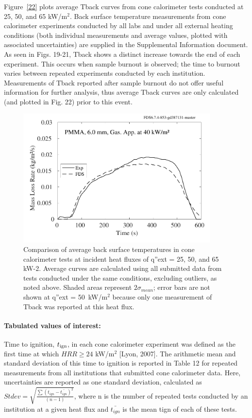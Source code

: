 \documentclass{book}
\begin{document}
Figure~\ref{22} plots average Tback curves from cone calorimeter tests conducted at 25, 50, and 65 kW/m$^2$. Back surface temperature measurements from cone calorimeter experiments conducted by all labs and under all external heating conditions (both individual measurements and average values, plotted with associated uncertainties) are supplied in the Supplemental Information document. As seen in Figs. 19-21, Tback shows a distinct increase towards the end of each experiment. This occurs when sample burnout is observed; the time to burnout varies between repeated experiments conducted by each institution. Measurements of Tback reported after sample burnout do not offer useful information for further analysis, thus average Tback curves are only calculated (and plotted in Fig. 22) prior to this event.

\begin{figure}
  \centering
  \includegraphics[width=4in]{SCRIPT_FIGURES/PMMA_40}
  \caption{Comparison of average back surface temperatures in cone calorimeter tests at incident heat fluxes of q”ext = 25, 50, and 65 kW-2. Average curves are calculated using all submitted data from tests conducted under the same conditions, excluding outliers, as noted above. Shaded areas represent $2\sigma_{mean}$; error bars are not shown at q”ext = 50~kW/m$^2$ because only one measurement of Tback was reported at this heat flux.}
  \label{Fig_22}
\end{figure}


\paragraph{Tabulated values of interest:}

Time to ignition, $t_{\rm ign}$, in each cone calorimeter experiment was defined as the first time at which $HRR \ge 24$ kW/m$^2$ [Lyon, 2007]. The arithmetic mean and standard deviation of this time to ignition is reported in Table 12 for repeated measurements from all institutions that submitted cone calorimeter data. Here, uncertainties are reported as one standard deviation, calculated as $Stdev=\sqrt{\frac{\sum\left(t_{ign}-\bar{t_{ign}}\right)^2}{(n-1)}}$, where n is the number of repeated tests conducted by an institution at a given heat flux and $\bar{t_{ign}}$ is the mean tign of each of these tests.
\end{document}
